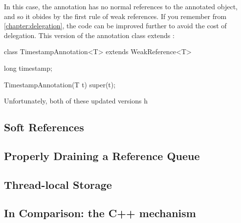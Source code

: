 In this case, the annotation has no normal references to the annotated object,
and so it obides by the first rule of weak references. If you remember from
\autoref{chapter:delegation}, the code can be improved further to avoid the cost
of delegation. This version of the annotation class extends
:

\begin{shortlisting}
class TimestampAnnotation<T> extends WeakReference<T> {
	long timestamp;
	
	TimestampAnnotation(T t) {
		super(t);
	}
}
\end{shortlisting}

Unfortunately, both of these updated versions h

\subsection{Soft References}

\subsection{Properly Draining a Reference Queue}

\subsection{Thread-local Storage}

\subsection{In Comparison: the C++  mechanism}

